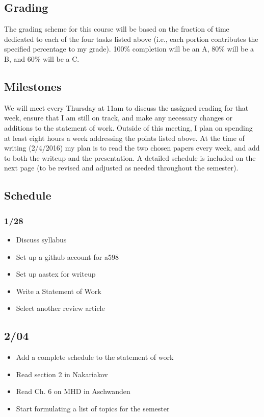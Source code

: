\documentclass[12pt]{article}
\begin{document}
\newpage
\subsection*{Grading}
The grading scheme for this course will be based on the fraction of
time dedicated to each
of the four tasks listed above (i.e., each portion contributes the
specified percentage to my grade). 100\% completion will be an A,
80\% will be a B, and 60\% will be a C.

\subsection*{Milestones}
We will meet every Thursday at 11am to discuss the assigned reading
for that week, ensure that I am still on track, and make any necessary
changes or additions to the statement of
work. Outside of this meeting, I plan on spending at least eight hours
a week addressing the points listed above. At the time of writing
(2/4/2016) my plan is to read the two chosen papers every
week, and add to both the writeup and the presentation.
A detailed schedule is included on the next page
(to be revised and adjusted as needed throughout the semester).

\newpage
\subsection*{Schedule}
\subsubsection*{1/28}
\begin{itemize}
    \item Discuss syllabus
    \item Set up a github account for a598
    \item Set up aastex for writeup
    \item Write a Statement of Work
    \item Select another review article
\end{itemize}

\subsection*{2/04}
\begin{itemize}
    \item Add a complete schedule to the statement of work
    \item Read section 2 in Nakariakov
    \item Read Ch. 6 on MHD in Aschwanden
    \item Start formulating a list of topics for the semester
\end{itemize}
\end{document}
